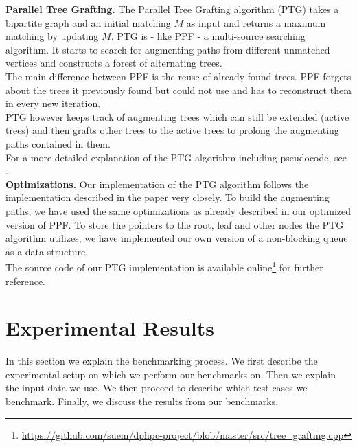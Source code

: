 \documentclass[letterpaper]{article}
\newcommand{\mypar}[1]{{\bf #1.}}
\begin{document}
\mypar{Parallel Tree Grafting} 
The Parallel Tree Grafting algorithm (PTG) takes a bipartite graph and an initial matching $M$ as input and returns a maximum matching by updating $M$.
PTG is - like PPF - a multi-source searching algorithm. It starts to search for augmenting paths from different unmatched vertices and constructs a forest of alternating trees.\\
The main difference between PPF is the reuse of already found trees. PPF forgets about the trees it previously found but could not use and has to reconstruct them in every new iteration.\\
PTG however keeps track of augmenting trees which can still be extended (active trees) and then grafts other trees to the active trees to prolong the augmenting paths contained in them.\\
For a more detailed explanation of the PTG algorithm including pseudocode, see \cite{Azad:2015}.\\

\mypar{Optimizations}
Our implementation of the PTG algorithm follows the implementation described in the paper very closely. To build the augmenting paths, we have used the same optimizations as already described in our optimized version of PPF. To store the pointers to the root, leaf and other nodes the PTG algorithm utilizes, we have implemented our own version of a non-blocking queue as a data structure. \\

The source code of our PTG implementation is available online\footnote{\url{https://github.com/suem/dphpc-project/blob/master/src/tree_grafting.cpp}} for further reference.


\section{Experimental Results}\label{sec:exp}

In this section we explain the benchmarking process. We first describe the experimental setup on which we perform our benchmarks on. Then we explain the input data we use. We then proceed to describe which test cases we benchmark. Finally, we discuss the results from our benchmarks.\\
\end{document}
